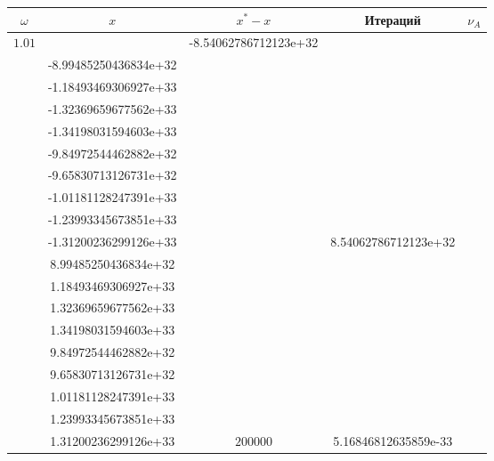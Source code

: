 \documentclass[oneside, final, 12pt]{extarticle}
\begin{document}
\begin{longtable}{|c|c|c|c|c|} \hline
\(\omega\)&\(x\)&\(x^*-x\)&Итераций&\(\nu_A\)\\ \hline
\(1.01\) &
\(\begin{aligned} & -8.54062786712123e+32 \\ & -8.99485250436834e+32 \\ & -1.18493469306927e+33 \\ & -1.32369659677562e+33 \\ & -1.34198031594603e+33 \\ & -9.84972544462882e+32 \\ & -9.65830713126731e+32 \\ & -1.01181128247391e+33 \\ & -1.23993345673851e+33 \\ & -1.31200236299126e+33 \end{aligned}\) &
\(\begin{aligned} & 8.54062786712123e+32 \\ & 8.99485250436834e+32 \\ & 1.18493469306927e+33 \\ & 1.32369659677562e+33 \\ & 1.34198031594603e+33 \\ & 9.84972544462882e+32 \\ & 9.65830713126731e+32 \\ & 1.01181128247391e+33 \\ & 1.23993345673851e+33 \\ & 1.31200236299126e+33 \end{aligned}\) &
\(200000\) & 5.16846812635859e-33 \\ \hline

\end{longtable}
\end{document}
